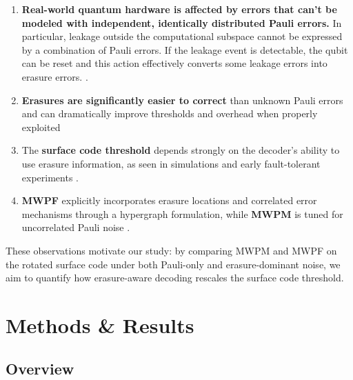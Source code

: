 \documentclass[11pt, notitlepage, letterpaper]{article}
\begin{document}
\begin{enumerate}
    \item \textbf{Real-world quantum hardware is affected by errors that can't be modeled with independent, identically distributed Pauli errors.} In particular, leakage outside the computational subspace cannot be expressed by a combination of Pauli errors. If the leakage event is detectable, the qubit can be reset and this action effectively converts some leakage errors into erasure errors. \cite{wu_erasure_2022}\cite{ma_high-fidelity_2023}\cite{scholl_erasure_2023}
          \cite{chow_circuit-based_2024}\cite{kubica_erasure_2023}\cite{gu_fault-tolerant_2025}.

    \item \textbf{Erasures are significantly easier to correct} than unknown Pauli errors and can
          dramatically improve thresholds and overhead when properly exploited%
          \cite{wu_erasure_2022}
          \cite{sahay_high-threshold_2023}\cite{gu_optimizing_2024}\cite{baranes_leveraging_2025}


    \item The \textbf{surface code threshold} depends strongly on the decoder’s ability
          to use erasure information, as seen in simulations and early fault-tolerant experiments%
          \cite{fowler_surface_2012,acharya_quantum_2025,bluvstein_logical_2024,
              reichardt_fault-tolerant_2025,kobayashi_erasure-tolerance_2025}.

    \item \textbf{MWPF} explicitly incorporates erasure locations and correlated error mechanisms
          through a hypergraph formulation, while \textbf{MWPM} is tuned for uncorrelated Pauli noise%
          \cite{oscarhiggott_oscarhiggottpymatching_2025,higgott_sparse_2025,
              wu_minimum-weight_2025}.
\end{enumerate}

These observations motivate our study: by comparing MWPM and MWPF on the rotated surface code under both Pauli-only and erasure-dominant noise, we aim to quantify how erasure-aware decoding rescales the surface code threshold.

\section{Methods \& Results}\label{sec:results}
\subsection{Overview}\label{sec:results-overview}
\end{document}
